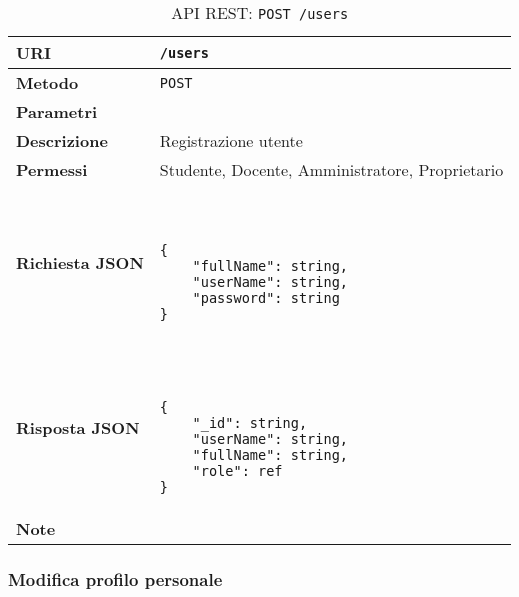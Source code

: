         \begin{table}[H]
            \begin{center}
                \begin{tabular}{p{} p{}}
                    \toprule
                    \textbf{URI} & \texttt{/users} \\ \midrule
                    \textbf{Metodo} & \texttt{POST} \\ \midrule
                    \textbf{Parametri} & \\ \midrule
                    \textbf{Descrizione} & Registrazione utente \\ \midrule
                    \textbf{Permessi} & Studente, Docente, Amministratore, Proprietario  \\ \midrule
                    \textbf{Richiesta JSON} & \
                        \begin{lstlisting}[basicstyle={\ttfamily}]
{
    "fullName": string,
    "userName": string,
    "password": string
}
                        \end{lstlisting}
                        \\ \midrule
                    \textbf{Risposta JSON} & \
                        \begin{lstlisting}[basicstyle={\ttfamily}]
{
    "_id": string,
    "userName": string,
    "fullName": string,
    "role": ref
}
                        \end{lstlisting}
                    	\\ \midrule
                    \textbf{Note} & \\
                    \bottomrule
                \end{tabular}
                \caption{API REST: \texttt{POST /users}}
            \end{center}
        \end{table}

    \subsubsection{Modifica profilo personale}


